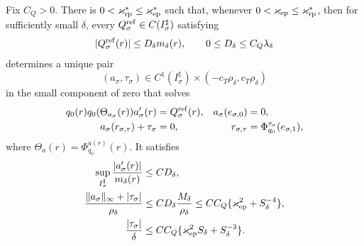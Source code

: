 \begin{theorem}
Fix \(C_Q>0\).  There is
\(0<\varkappa_{\rm rp}^*\le\varkappa_{\rm ep}^*\) such that, whenever
\(0<\varkappa_{\rm ep}\le\varkappa_{\rm rp}^*\), then for sufficiently
small \(\delta\), every
\(Q_{\sigma}^{\rm ref}\in C(I_\sigma^\sharp)\) satisfying
\begin{equation}
 |Q_{\sigma}^{\rm ref}(r)|\le D_\delta m_\delta(r),
 \qquad 0\le D_\delta\le C_Q\lambda_\delta             \label{eq:reference-pulled-source-class}
\end{equation}
determines a unique pair
\begin{equation*}
 (a_\sigma,\tau_\sigma)\in
 C^1(I_\sigma^\sharp)\times
 (-c_T\rho_\delta,c_T\rho_\delta)
\end{equation*}
in the small component of zero that solves
\begin{align}
 q_0(r)q_0(\Theta_{a_\sigma}(r))a_\sigma'(r)
 &=Q_{\sigma}^{\rm ref}(r),
 &a_\sigma(e_{\sigma,0})&=0,                   \label{eq:reference-pulled-causal-phase}\\
 a_\sigma(r_{\sigma,\tau})+\tau_\sigma&=0,
 &r_{\sigma,\tau}
 &=\Phi_{q_0}^{\tau_\sigma}(e_{\sigma,1}),     \label{eq:reference-pulled-terminal-row}
\end{align}
where
\(\Theta_a(r)=\Phi_{q_0}^{a(r)}(r)\).  It satisfies
\begin{align}
 \sup_{I_\sigma^\sharp}
       \frac{|a_\sigma'(r)|}{m_\delta(r)}
 &\le CD_\delta,\notag\\
 \frac{\|a_\sigma\|_\infty+|\tau_\sigma|}{\rho_\delta}
 &\le C D_\delta\frac{M_\delta}{\rho_\delta}
 \le CC_Q\{\varkappa_{\rm ep}^2+S_\delta^{-4}\},
                                                        \label{eq:reference-pulled-relative-bound}\\
 \frac{|\tau_\sigma|}{\delta}
 &\le CC_Q\{\varkappa_{\rm ep}^2S_\delta+S_\delta^{-3}\}.
                                                        \label{eq:reference-pulled-fold-time-bound}
\end{align}


\end{theorem}
